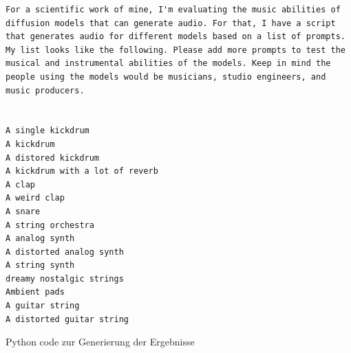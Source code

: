 \documentclass[
  a4paper,  %
  twoside,  %
  bibliography=totoc,
  headsepline,
  cleardoublepage=empty,
  parskip=half,
  draft=false
]{scrbook}
\begin{document}
\begin{lstlisting}[style=gpt]
For a scientific work of mine, I'm evaluating the music abilities of diffusion models that can generate audio. For that, I have a script that generates audio for different models based on a list of prompts. My list looks like the following. Please add more prompts to test the musical and instrumental abilities of the models. Keep in mind the people using the models would be musicians, studio engineers, and music producers. 


A single kickdrum
A kickdrum
A distored kickdrum
A kickdrum with a lot of reverb
A clap
A weird clap
A snare
A string orchestra
A analog synth
A distorted analog synth
A string synth
dreamy nostalgic strings
Ambient pads
A guitar string
A distorted guitar string
\end{lstlisting}

\begin{Listing}

 \caption{Python code zur Generierung der Ergebnisse}
  \label{lst:generator}
\end{Listing}
%
\pagestyle{empty}
\renewcommand*{\chapterpagestyle}{empty}
\Affirmation
\end{document}
